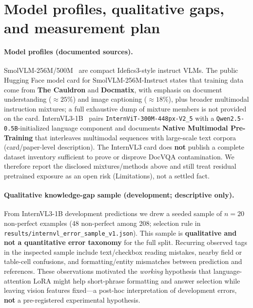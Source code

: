 \documentclass[11pt,a4paper]{article}
\begin{document}
\section{Model profiles, qualitative gaps, and measurement plan}
\label{sec:profiles}

\paragraph{Model profiles (documented sources).}
SmolVLM-256M/500M~\citep{marafioti2025smolvlm} are compact Idefics3-style instruct VLMs.
The public Hugging Face model card for SmolVLM-256M-Instruct states that training data come from \textbf{The Cauldron} and \textbf{Docmatix}, with emphasis on document understanding (${\approx}25\%$) and image captioning (${\approx}18\%$), plus broader multimodal instruction mixtures; a full exhaustive dump of mixture members is not provided on the card.
InternVL3-1B~\citep{zhu2025internvl3,opengvlab2025internvl3_1b_card} pairs \texttt{InternViT-300M-448px-V2\_5} with a \texttt{Qwen2.5-0.5B}-initialized language component and documents \textbf{Native Multimodal Pre-Training} that interleaves multimodal sequences with large-scale text corpora (card/paper-level description).
The InternVL3 card does \textbf{not} publish a complete dataset inventory sufficient to prove or disprove DocVQA contamination.
We therefore report the disclosed mixtures/methods above and still treat residual pretrained exposure as an open risk (Limitations), not a settled fact.

\paragraph{Qualitative knowledge-gap sample (development; descriptive only).}
From InternVL3-1B development predictions we drew a seeded sample of $n{=}20$ non-perfect examples (48 non-perfect among 208; selection rule in \texttt{results/internvl\_error\_sample\_v1.json}).
This sample is \textbf{qualitative and not a quantitative error taxonomy} for the full split.
Recurring observed tags in the inspected sample include text/checkbox reading mistakes, nearby field or table-cell confusions, and formatting/entity mismatches between prediction and references.
These observations motivated the \emph{working} hypothesis that language-attention LoRA might help short-phrase formatting and answer selection while leaving vision features fixed---a post-hoc interpretation of development errors, \textbf{not} a pre-registered experimental hypothesis.
\end{document}
